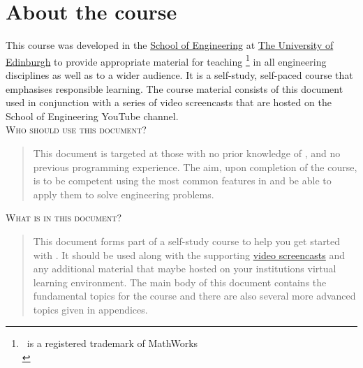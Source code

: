 \begingroup
\let\clearpage\relax
\let\cleardoublepage\relax
\let\cleardoublepage\relax

\chapter*{About the course}
This course was developed in the \href{http://www.eng.ed.ac.uk}{School of Engineering} at \href{http://www.ed.ac.uk}{The University of Edinburgh} to provide appropriate material for teaching \mlab \footnote{\mlab\textregistered\ is a registered trademark of MathWorks\\} in all engineering disciplines as well as to a wider audience. It is a self-study, self-paced course that emphasises responsible learning. The course material consists of this document used in conjunction with a series of video screencasts that are hosted on the School of Engineering YouTube channel.\\

\textsc{Who should use this document?}
\begin{quote}
This document is targeted at those with no prior knowledge of \mlab, and no previous programming experience. The aim, upon completion of the course, is to be competent using the most common features in \mlab and be able to apply them to solve engineering problems.
\end{quote}

\textsc{What is in this document?}
\begin{quote}
This document forms part of a self-study course to help you get started with \mlab. It should be used along with the supporting \href{https://www.youtube.com/playlist?list=PLDlE-GBjzmBZsxFKZfp6Y59qDOJVIh4RN}{video screencasts} and any additional material that maybe hosted on your institutions virtual learning environment. The main body of this document contains the fundamental topics for the course and there are also several more advanced topics given in appendices.
\end{quote}

